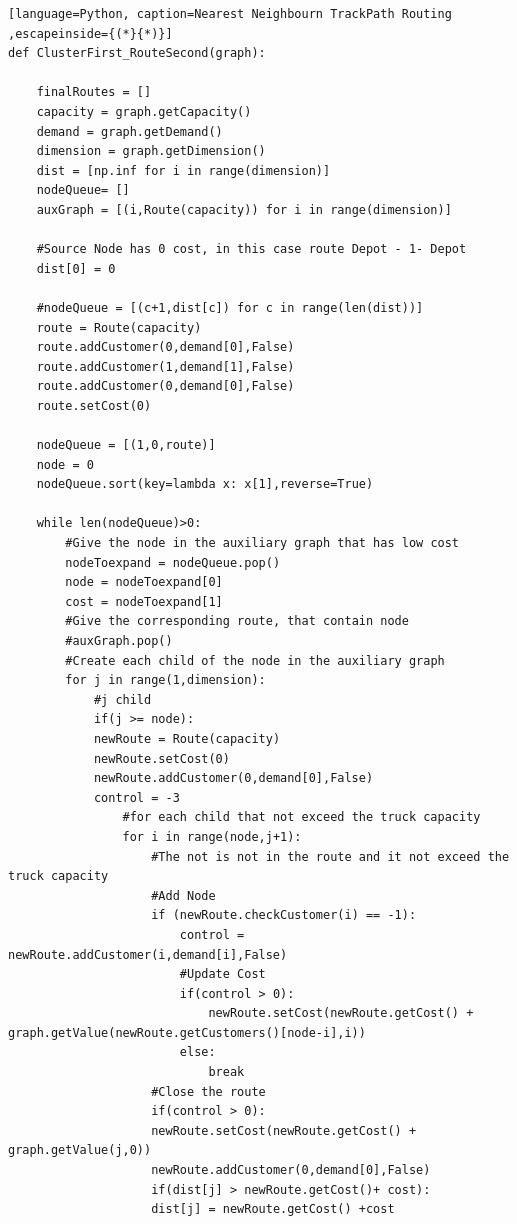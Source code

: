 \documentclass[]{article}
\begin{document}
\begin{lstlisting}[language=Python, caption=Nearest Neighbourn TrackPath Routing ,escapeinside={(*}{*)}]
def ClusterFirst_RouteSecond(graph):

	finalRoutes = []
	capacity = graph.getCapacity()
	demand = graph.getDemand()
	dimension = graph.getDimension()
	dist = [np.inf for i in range(dimension)]
	nodeQueue= []
	auxGraph = [(i,Route(capacity)) for i in range(dimension)]
	
	#Source Node has 0 cost, in this case route Depot - 1- Depot
	dist[0] = 0
	
	#nodeQueue = [(c+1,dist[c]) for c in range(len(dist))]
	route = Route(capacity)
	route.addCustomer(0,demand[0],False)
	route.addCustomer(1,demand[1],False)
	route.addCustomer(0,demand[0],False)
	route.setCost(0)
	
	nodeQueue = [(1,0,route)]
	node = 0
	nodeQueue.sort(key=lambda x: x[1],reverse=True)
	
	while len(nodeQueue)>0:
		#Give the node in the auxiliary graph that has low cost
		nodeToexpand = nodeQueue.pop()
		node = nodeToexpand[0]
		cost = nodeToexpand[1]
		#Give the corresponding route, that contain node
		#auxGraph.pop()
		#Create each child of the node in the auxiliary graph
		for j in range(1,dimension):
			#j child
			if(j >= node):
			newRoute = Route(capacity)
			newRoute.setCost(0)
			newRoute.addCustomer(0,demand[0],False)
			control = -3
				#for each child that not exceed the truck capacity
				for i in range(node,j+1):
					#The not is not in the route and it not exceed the truck capacity
					#Add Node
					if (newRoute.checkCustomer(i) == -1):
						control = newRoute.addCustomer(i,demand[i],False)
						#Update Cost
						if(control > 0):
							newRoute.setCost(newRoute.getCost() + graph.getValue(newRoute.getCustomers()[node-i],i))
						else:                            
							break
					#Close the route 
					if(control > 0):
					newRoute.setCost(newRoute.getCost() + graph.getValue(j,0))
					newRoute.addCustomer(0,demand[0],False)
					if(dist[j] > newRoute.getCost()+ cost):
					dist[j] = newRoute.getCost() +cost
		



\end{lstlisting}




\end{document}
